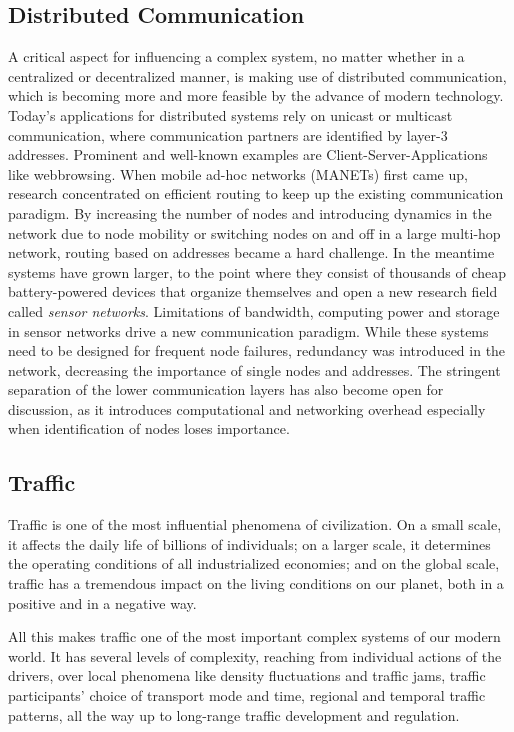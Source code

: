 \documentclass{acmrip}
\begin{document}
\subsection{Distributed Communication}
A critical aspect for influencing a complex system, no matter whether in a
centralized or decentralized manner, is making use of distributed
communication, which is becoming more and more feasible by the advance of
modern technology.  Today's applications for distributed systems rely on
unicast or multicast communication, where communication partners are identified
by layer-3 addresses. Prominent and well-known examples are
Client-Server-Applications like webbrow\-sing. When mobile ad-hoc networks
(MANETs) first came up, research concentrated on efficient routing to keep up
the existing communication paradigm. By increasing the number of nodes and
introducing dynamics in the network due to node mobility or switching nodes on
and off in a large multi-hop network, routing based on addresses became a hard
challenge. In the meantime systems have grown larger, to the point where they consist of thousands of cheap
battery-powered devices that organize themselves and open a new research field
called {\em sensor networks}. Limitations of bandwidth, computing power and storage
in sensor networks drive a new communication paradigm. While these systems need
to be designed for frequent node failures, redundancy was introduced in the
network, decreasing the importance of single nodes and addresses. The
stringent separation of the lower communication layers has also become open for discussion, as
it introduces computational and networking overhead especially when
identification of nodes loses importance.

\subsection{Traffic}
Traffic is one of the most influential phenomena of civilization. On
a small scale, it affects the daily life of billions of individuals;
on a larger scale, it determines the operating conditions of all
industrialized economies; and on the global scale, traffic has a
tremendous impact on the living conditions on our planet, both in a
positive and in a negative way.

All this makes traffic one of the most important complex systems of
our modern world. It has several levels of complexity, reaching from
individual actions of the drivers, over local phenomena like density
fluctuations and traffic jams, traffic participants' choice of
transport mode and time, regional and temporal traffic patterns, all
the way up to long-range traffic development and regulation.
\end{document}
